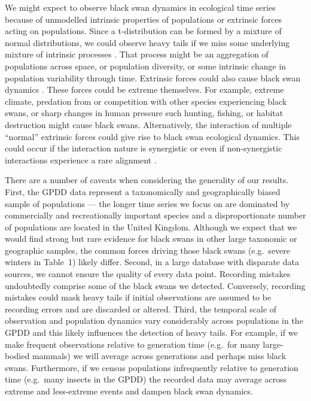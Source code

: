 We might expect to observe black swan dynamics in ecological time series
because of unmodelled intrinsic properties of populations or extrinsic forces
acting on populations. Since a t-distribution can be formed by a mixture of
normal distributions, we could observe heavy tails if we miss some underlying
mixture of intrinsic processes \citep{allen2001}. That process might be an
aggregation of populations across space, or population diversity, or some
intrinsic change in population variability through time. Extrinsic forces
could also cause black swan dynamics \citep[e.g.][]{nunez2012}. These forces
could be extreme themselves. For example, extreme climate, predation from or
competition with other species experiencing black swans, or sharp changes in
human pressure such hunting, fishing, or habitat destruction might cause black
swans. Alternatively, the interaction of multiple ``normal'' extrinsic
forces could give rise to black swan ecological dynamics. This could occur if
the interaction nature is synergistic \citep[e.g.][]{kirby2009} or even if
non-synergistic interactions experience a rare alignment \citep{denny2009}.

There are a number of caveats when considering the generality of our results.
First, the GPDD data represent a taxonomically and geographically biased sample
of populations --- the longer time series we focus on are dominated by
commercially and recreationally important species and a disproportionate number
of populations are located in the United Kingdom. Although we expect that we
would find strong but rare evidence for black swans in other large taxonomic or
geographic samples, the common forces driving those black swans (e.g.~severe
winters in Table~1) likely differ. Second, in a large database with disparate
data sources, we cannot ensure the quality of every data point. Recording
mistakes undoubtedly comprise some of the black swans we detected. Conversely,
recording mistakes could mask heavy tails if initial observations are assumed
to be recording errors and are discarded or altered. Third, the temporal scale
of observation and population dynamics vary considerably across populations in
the GPDD and this likely influences the detection of heavy tails. For example,
if we make frequent observations relative to generation time (e.g.~for many
large-bodied mammals) we will average across generations and perhaps miss
black swans. Furthermore, if we census populations infrequently relative to
generation time (e.g.~many insects in the GPDD) the recorded data may average
across extreme and less-extreme events and dampen black swan dynamics.

